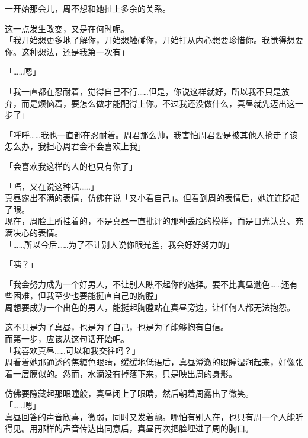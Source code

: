 一开始那会儿，周不想和她扯上多余的关系。

这一点发生改变，又是在何时呢。\\

「我开始想更多地了解你，开始想触碰你，开始打从内心想要珍惜你。我觉得想要你。这种想法，还是我第一次有」

「……嗯」

「我一直都在忍耐着，觉得自己不行……但是，你说这样就好，所以我不只是放弃，而是烦恼着，要怎么做才能配得上你。不过我还没做什么，真昼就先迈出这一步了」

「呼呼……我也一直都在忍耐着。周君那么帅，我害怕周君要是被其他人抢走了该怎么办，我担心周君会不会喜欢上我」

「会喜欢我这样的人的也只有你了」

「唔，又在说这种话……」\\

真昼露出不满的表情，仿佛在说「又小看自己」。但看到周的表情后，她连连眨起了眼。\\

现在，周脸上所挂着的，不是真昼一直批评的那种丢脸的模样，而是目光认真、充满决心的表情。\\

「……所以今后……为了不让别人说你眼光差，我会好好努力的」

「咦？」

「我会努力成为一个好男人，不让别人瞧不起你的选择。要不比真昼逊色……还有些困难，但我至少也要能挺直自己的胸膛」\\

周想要成为一个出色的男人，能挺起胸膛站在真昼旁边，让任何人都无法抱怨。

这不只是为了真昼，也是为了自己，也是为了能够抱有自信。\\

而第一步，应该从这句话开始吧。\\

「我喜欢真昼……可以和我交往吗？」\\

周看着她那通透的焦糖色眼睛，缓缓地低语后，真昼澄澈的眼瞳湿润起来，好像张着一层膜似的。然而，水滴没有掉落下来，只是映出周的身影。

仿佛要隐藏起那眼瞳般，真昼闭上了眼睛，然后朝着周露出了微笑。\\

「……嗯」\\

真昼回答的声音欣喜，微弱，同时又发着颤。哪怕有别人在，也只有周一个人能听得见。用那样的声音传达出同意后，真昼再次把脸埋进了周的胸口。

